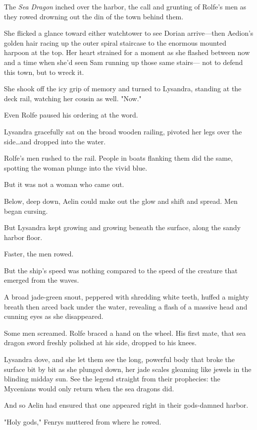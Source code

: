 The \emph{Sea Dragon} inched over the harbor, the call and grunting of Rolfe's men as they rowed drowning out the din of the town behind them.

She flicked a glance toward either watchtower to see Dorian arrive---then Aedion's golden hair racing up the outer spiral staircase to the enormous mounted harpoon at the top.
Her heart strained for a moment as she flashed between now and a time when she'd seen Sam running up those same stairs--- not to defend this town, but to wreck it.

She shook off the icy grip of memory and turned to Lysandra, standing at the deck rail, watching her cousin as well.
"Now."

Even Rolfe paused his ordering at the word.

Lysandra gracefully sat on the broad wooden railing, pivoted her legs over the side\ldots and dropped into the water.

Rolfe's men rushed to the rail.
People in boats flanking them did the same, spotting the woman plunge into the vivid blue.

But it was not a woman who came out.

Below, deep down, Aelin could make out the glow and shift and spread.
Men began cursing.

But Lysandra kept growing and growing beneath the surface, along the sandy harbor floor.

Faster, the men rowed.

But the ship's speed was nothing compared to the speed of the creature that emerged from the waves.

A broad jade-green snout, peppered with shredding white teeth, huffed a mighty breath then arced back under the water, revealing a flash of a massive head and cunning eyes as she disappeared.

Some men screamed.
Rolfe braced a hand on the wheel.
His first mate, that sea dragon sword freshly polished at his side, dropped to his knees.

Lysandra dove, and she let them see the long, powerful body that broke the surface bit by bit as she plunged down, her jade scales gleaming like jewels in the blinding midday sun.
See the legend straight from their prophecies: the Mycenians would only return when the sea dragons did.

And so Aelin had ensured that one appeared right in their gods-damned harbor.

"Holy gods," Fenrys muttered from where he rowed.

